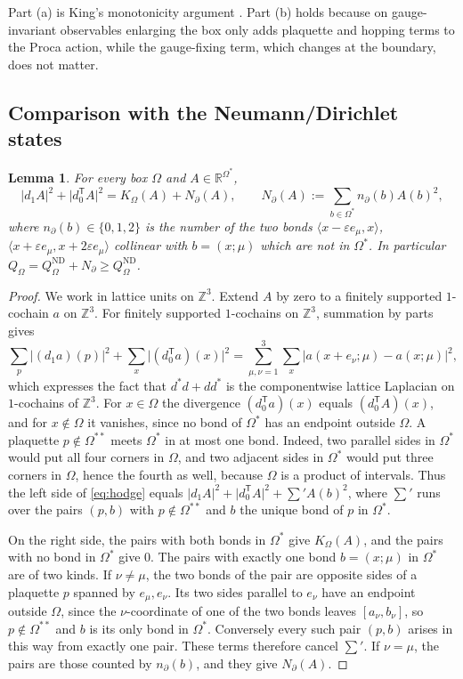 \documentclass[11pt]{amsart}
\theoremstyle{plain}
\newtheorem{lemma}[theorem]{Lemma}
\theoremstyle{definition}
\theoremstyle{remark}
\numberwithin{equation}{section}
\newcommand{\R}{\mathbb{R}}
\newcommand{\Z}{\mathbb{Z}}
\newcommand{\eps}{\varepsilon}
\newcommand{\abs}[1]{\lvert #1\rvert}
\newcommand{\ev}[1]{\langle #1\rangle}
\begin{document}
Part (a) is King's monotonicity argument \cite[Thm.~3.2 and its proof, pp.~333--334]{K2}. Part (b) holds because on gauge-invariant observables enlarging the box only adds plaquette and hopping terms to the Proca action, while the gauge-fixing term, which changes at the boundary, does not matter.

\subsection{Comparison with the Neumann/Dirichlet states}

\begin{lemma}\label{lem:identity}
For every box $\Omega$ and $A\in\R^{\Omega^*}$,
\[
\abs{d_1A}^2+\abs{d_0^{\mathsf T}A}^2=K_\Omega(A)+N_\partial(A),\qquad N_\partial(A):=\sum_{b\in\Omega^*}n_\partial(b)A(b)^2 ,
\]
where $n_\partial(b)\in\{0,1,2\}$ is the number of the two bonds $\ev{x-\eps e_\mu,x}$, $\ev{x+\eps e_\mu,x+2\eps e_\mu}$ collinear with $b=(x;\mu)$ which are not in $\Omega^*$. In particular $Q_\Omega=Q^{\mathrm{ND}}_\Omega+N_\partial\ge Q^{\mathrm{ND}}_\Omega$.
\end{lemma}

\begin{proof}
We work in lattice units on $\Z^3$. Extend $A$ by zero to a finitely supported $1$-cochain $a$ on $\Z^3$. For finitely supported $1$-cochains on $\Z^3$, summation by parts gives
\begin{equation}\label{eq:hodge}
\sum_p\abs{(d_1a)(p)}^2+\sum_x\abs{(d_0^{\mathsf T}a)(x)}^2=\sum_{\mu,\nu=1}^3\sum_x\abs{a(x+e_\nu;\mu)-a(x;\mu)}^2 ,
\end{equation}
which expresses the fact that $d^*d+dd^*$ is the componentwise lattice Laplacian on $1$-cochains of $\Z^3$. For $x\in\Omega$ the divergence $(d_0^{\mathsf T}a)(x)$ equals $(d_0^{\mathsf T}A)(x)$, and for $x\notin\Omega$ it vanishes, since no bond of $\Omega^*$ has an endpoint outside $\Omega$. A plaquette $p\notin\Omega^{**}$ meets $\Omega^*$ in at most one bond. Indeed, two parallel sides in $\Omega^*$ would put all four corners in $\Omega$, and two adjacent sides in $\Omega^*$ would put three corners in $\Omega$, hence the fourth as well, because $\Omega$ is a product of intervals. Thus the left side of \eqref{eq:hodge} equals $\abs{d_1A}^2+\abs{d_0^{\mathsf T}A}^2+\sum'A(b)^2$, where $\sum'$ runs over the pairs $(p,b)$ with $p\notin\Omega^{**}$ and $b$ the unique bond of $p$ in $\Omega^*$.

On the right side, the pairs with both bonds in $\Omega^*$ give $K_\Omega(A)$, and the pairs with no bond in $\Omega^*$ give $0$. The pairs with exactly one bond $b=(x;\mu)$ in $\Omega^*$ are of two kinds. If $\nu\ne\mu$, the two bonds of the pair are opposite sides of a plaquette $p$ spanned by $e_\mu,e_\nu$. Its two sides parallel to $e_\nu$ have an endpoint outside $\Omega$, since the $\nu$-coordinate of one of the two bonds leaves $[a_\nu,b_\nu]$, so $p\notin\Omega^{**}$ and $b$ is its only bond in $\Omega^*$. Conversely every such pair $(p,b)$ arises in this way from exactly one pair. These terms therefore cancel $\sum'$. If $\nu=\mu$, the pairs are those counted by $n_\partial(b)$, and they give $N_\partial(A)$.
\end{proof}
\end{document}
